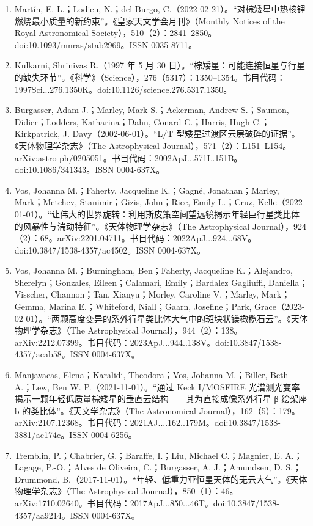 \begin{enumerate}
\item Martín, E. L.；Lodieu, N.；del Burgo, C.（2022-02-21）。“对棕矮星中热核锂燃烧最小质量的新约束”。《皇家天文学会月刊》（Monthly Notices of the Royal Astronomical Society），510（2）：2841–2850。doi:10.1093/mnras/stab2969。ISSN 0035-8711。
\item Kulkarni, Shrinivas R.（1997 年 5 月 30 日）。“棕矮星：可能连接恒星与行星的缺失环节”。《科学》（Science），276（5317）：1350–1354。书目代码：1997Sci...276.1350K。doi:10.1126/science.276.5317.1350。
\item Burgasser, Adam J.；Marley, Mark S.；Ackerman, Andrew S.；Saumon, Didier；Lodders, Katharina；Dahn, Conard C.；Harris, Hugh C.；Kirkpatrick, J. Davy（2002-06-01）。“L/T 型矮星过渡区云层破碎的证据”。《天体物理学杂志》（The Astrophysical Journal），571（2）：L151–L154。arXiv:astro-ph/0205051。书目代码：2002ApJ...571L.151B。doi:10.1086/341343。ISSN 0004-637X。
\item Vos, Johanna M.；Faherty, Jacqueline K.；Gagné, Jonathan；Marley, Mark；Metchev, Stanimir；Gizis, John；Rice, Emily L.；Cruz, Kelle（2022-01-01）。“让伟大的世界旋转：利用斯皮策空间望远镜揭示年轻巨行星类比体的风暴性与湍动特征”。《天体物理学杂志》（The Astrophysical Journal），924（2）：68。arXiv:2201.04711。书目代码：2022ApJ...924...68V。doi:10.3847/1538-4357/ac4502。ISSN 0004-637X。
\item Vos, Johanna M.；Burningham, Ben；Faherty, Jacqueline K.；Alejandro, Sherelyn；Gonzales, Eileen；Calamari, Emily；Bardalez Gagliuffi, Daniella；Visscher, Channon；Tan, Xianyu；Morley, Caroline V.；Marley, Mark；Gemma, Marina E.；Whiteford, Niall；Gaarn, Josefine；Park, Grace（2023-02-01）。“两颗高度变异的系外行星类比体大气中的斑块状镁橄榄石云”。《天体物理学杂志》（The Astrophysical Journal），944（2）：138。arXiv:2212.07399。书目代码：2023ApJ...944..138V。doi:10.3847/1538-4357/acab58。ISSN 0004-637X。
\item Manjavacas, Elena；Karalidi, Theodora；Vos, Johanna M.；Biller, Beth A.；Lew, Ben W. P.（2021-11-01）。“通过 Keck I/MOSFIRE 光谱测光变率揭示一颗年轻低质量棕矮星的垂直云结构——其为直接成像系外行星 β-绘架座 b 的类比体”。《天文学杂志》（The Astronomical Journal），162（5）：179。arXiv:2107.12368。书目代码：2021AJ....162..179M。doi:10.3847/1538-3881/ac174c。ISSN 0004-6256。
\item Tremblin, P.；Chabrier, G.；Baraffe, I.；Liu, Michael C.；Magnier, E. A.；Lagage, P.-O.；Alves de Oliveira, C.；Burgasser, A. J.；Amundsen, D. S.；Drummond, B.（2017-11-01）。“年轻、低重力亚恒星天体的无云大气”。《天体物理学杂志》（The Astrophysical Journal），850（1）：46。arXiv:1710.02640。书目代码：2017ApJ...850...46T。doi:10.3847/1538-4357/aa9214。ISSN 0004-637X。

\end{enumerate}

